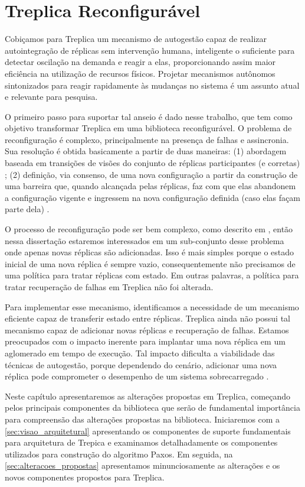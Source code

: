\chapter{Treplica Reconfigurável}\label{cap2:treplica_reconfiguravel}

Cobiçamos para Treplica um mecanismo de autogestão capaz de realizar autointegração de
réplicas sem intervenção humana, inteligente o suficiente para detectar oscilação na
demanda e reagir a elas, proporcionando assim maior eficiência na utilização de recursos
físicos. Projetar mecanismos autônomos sintonizados para reagir rapidamente às mudanças no
sistema é um assunto atual e relevante para pesquisa.

O primeiro passo para suportar tal anseio é dado nesse trabalho, que tem como objetivo
transformar Treplica em uma biblioteca reconfigurável. O problema de reconfiguração é
complexo, principalmente na presença de falhas e assincronia. Sua resolução é obtida
basicamente a partir de duas maneiras: (1) abordagem baseada em transições de visões do
conjunto de réplicas participantes (e corretas) \cite{birman87a, birman87b}; (2)
definição, via consenso, de uma nova configuração a partir da construção de uma barreira
que, quando alcançada pelas réplicas, faz com que elas abandonem a configuração vigente e
ingressem na nova configuração definida (caso elas façam parte dela) \cite{lamport10}.

O processo de reconfiguração pode ser bem complexo, como descrito em \cite{lamport10},
então nessa dissertação estaremos interessados em um sub-conjunto desse problema onde
apenas novas réplicas são adicionadas. Isso é mais simples porque o estado inicial de uma
nova réplica é sempre vazio, consequentemente não precisamos de uma política para tratar
réplicas com estado. Em outras palavras, a política para tratar recuperação de falhas em
Treplica não foi alterada.

Para implementar esse mecanismo, identificamos a necessidade de um mecanismo eficiente
capaz de transferir estado entre réplicas. Treplica ainda não possui tal mecanismo capaz
de adicionar novas réplicas e recuperação de falhas. Estamos preocupados com o impacto
inerente para implantar uma nova réplica em um aglomerado em tempo de execução. Tal
impacto dificulta a viabilidade das técnicas de autogestão, porque dependendo do cenário,
adicionar uma nova réplica pode comprometer o desempenho de um sistema sobrecarregado
\cite{vilaca09}.

Neste capítulo apresentaremos as alterações propostas em Treplica, começando pelos
principais componentes da biblioteca que serão de fundamental importância para compreensão
das alterações propostas na biblioteca. Iniciaremos com a \autoref{sec:visao_arquitetural}
apresentando os componentes de suporte fundamentais para arquitetura de Trepica e
examinamos detalhadamente os componentes utilizados para construção do algoritmo Paxos. Em
seguida, na \autoref{sec:alteracoes_propostas} apresentamos minunciosamente as alterações
e os novos componentes propostos para Treplica.


